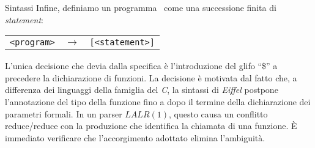 \begin{section}{Sintassi}
	Infine, definiamo un programma \ME \ come una successione 
	finita di \textit{statement}:

	\begin{center} \begin{tabular} {lll}
	\texttt{<program>} & $\rightarrow$ & \texttt{[<statement>]}
	\end{tabular} \end{center}

	L'unica decisione che devia dalla specifica \`e l'introduzione del
	glifo ``\$'' a precedere la dichiarazione di funzioni. La decisione
	\`e motivata dal fatto che, a differenza dei linguaggi della famiglia
	del \textit{C}, la sintassi di \textit{Eiffel} postpone l'annotazione
	del tipo della funzione fino a dopo il termine della dichiarazione
	dei parametri formali. In un parser \textbf{$LALR(1)$}, 
	questo causa un conflitto reduce/reduce con la produzione che
	identifica la chiamata di una funzione. \`E immediato verificare che
	l'accorgimento adottato elimina l'ambiguit\`a.

\end{section}
